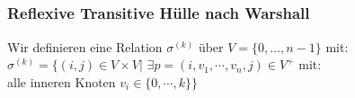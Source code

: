 \subsection*{}
\begin{frame}
	\frametitle{Reflexive Transitive Hülle nach Warshall}
	Wir definieren eine Relation $\sigma^{(k)}$ über $V=\{0,\dots,n-1\}$ mit:
		$\sigma^{(k)} = \{(i,j) \in V \times V |$
    $ \exists p = (i, v_1, \cdots, v_n, j) \in V^+$ mit:\\
    \hfill alle inneren Knoten $v_i \in \{0, \cdots, k\}\}$

	\begin{columns}
\end{columns}
\end{frame}
